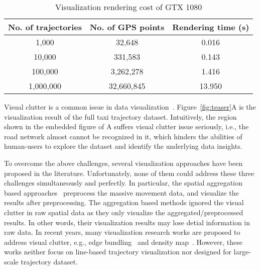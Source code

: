 \begin{table}
	\centering
    \small
	\caption{Visualization rendering cost of GTX 1080}
	\begin{tabular}{|c|c|c|} \hline
		No. of trajectories & No. of GPS points & Rendering time (s) \\ \hline
		1,000& 32,648 & 0.016\\ \hline
		10,000& 331,583 & 0.143\\ \hline
		100,000& 3,262,278 & 1.416\\ \hline
		1,000,000& 32,660,845 & 13.950\\ \hline
	\end{tabular}	\label{tab:gpu}
    \vspace{-4mm}
\end{table}

Visual clutter is a common issue in data visualization~\cite{clutter}.
Figure~\ref{fig:teaser}A is the visualization result of the full \pt{} taxi trajectory dataset.
Intuitively, the region shown in the embedded figure of A suffers visual clutter issue seriously,
i.e., the road network almost cannot be recognized in it,
which hinders the abilities of human-users to explore the dataset and identify the underlying data insights.



To overcome the above challenges, several visualization approaches have been proposed in the literature.
Unfortunately, none of them could address these three challenges simultaneously and perfectly.
In particular, the spatial aggregation based approaches~\cite{zeng2013visualizing,von2015mobilitygraphs} preprocess the massive movement data, and visualize the results after preprocessing.
The aggregation based methods ignored the visual clutter in raw spatial data as they only visualize the aggregated/preprocessed results.
In other words, their visualization results may lose detial information in raw data.
In recent years, many visualization research works are proposed to address visual clutter,
e.g., edge bundling~\cite{zeng2019route, thony2015vector} and density map~\cite{lampe2011interactive, scheepens2011interactive}.
However, these works neither focus on line-based trajectory visualization nor designed for large-scale trajectory dataset.

